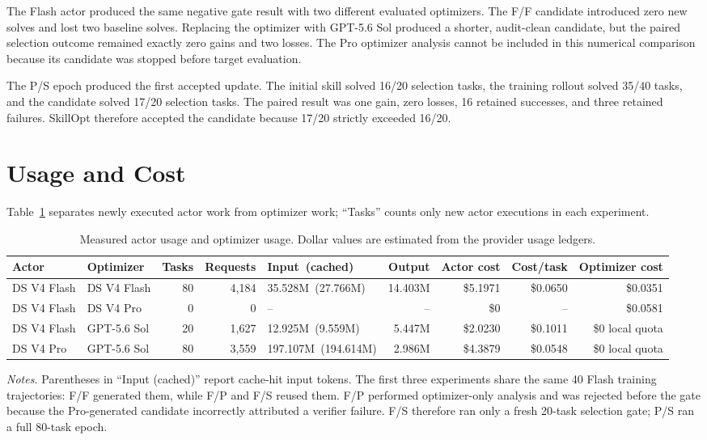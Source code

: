 \documentclass[11pt]{article}
\newcommand{\dflashshort}{DS V4 Flash}
\newcommand{\dproshort}{DS V4 Pro}
\newcommand{\sol}{GPT-5.6 Sol}
\newcommand{\na}{--}
\begin{document}
The Flash actor produced the same negative gate result with two different
evaluated optimizers. The F/F candidate introduced zero new solves and lost
two baseline solves. Replacing the optimizer with \sol{} produced a shorter,
audit-clean candidate, but the paired selection outcome remained exactly zero
gains and two losses. The Pro optimizer analysis cannot be included in this
numerical comparison because its candidate was stopped before target
evaluation.

The P/S epoch produced the first accepted update. The initial skill solved
16/20 selection tasks, the training rollout solved 35/40 tasks, and the
candidate solved 17/20 selection tasks. The paired result was one gain, zero
losses, 16 retained successes, and three retained failures. SkillOpt therefore
accepted the candidate because 17/20 strictly exceeded 16/20.

\section{Usage and Cost}

Table~\ref{tab:cost} separates newly executed actor work from optimizer work;
``Tasks'' counts only new actor executions in each experiment.

\begin{table}[t]
\centering
\scriptsize
\setlength{\tabcolsep}{3pt}
\begin{tabular*}{\textwidth}{@{\extracolsep{\fill}}llrrlrrrr@{}}
\toprule
Actor & Optimizer & Tasks & Requests & \mbox{Input (cached)} & Output & Actor cost & Cost/task & Optimizer cost \\
\midrule
\dflashshort{} & \dflashshort{} & 80 & 4,184 & \mbox{35.528M (27.766M)} & 14.403M & \$5.1971 & \$0.0650 & \$0.0351 \\
\dflashshort{} & \dproshort{} & 0 & 0 & \na{} & \na{} & \$0 & \na{} & \$0.0581 \\
\dflashshort{} & \sol{} & 20 & 1,627 & \mbox{12.925M (9.559M)} & 5.447M & \$2.0230 & \$0.1011 & \$0 local quota \\
\dproshort{} & \sol{} & 80 & 3,559 & \mbox{197.107M (194.614M)} & 2.986M & \$4.3879 & \$0.0548 & \$0 local quota \\
\bottomrule
\end{tabular*}
\vspace{2pt}
\begin{minipage}{\textwidth}\footnotesize
\emph{Notes.} Parentheses in ``Input (cached)'' report cache-hit input tokens.
The first three experiments share the same 40 Flash training trajectories:
F/F generated them, while F/P and F/S reused them. F/P performed optimizer-only
analysis and was rejected before the gate because the Pro-generated candidate
incorrectly attributed a verifier failure. F/S therefore ran only a fresh
20-task selection gate; P/S ran a full 80-task epoch.
\end{minipage}
\caption{Measured actor usage and optimizer usage. Dollar values are estimated
from the provider usage ledgers.}
\label{tab:cost}
\end{table}
\end{document}
